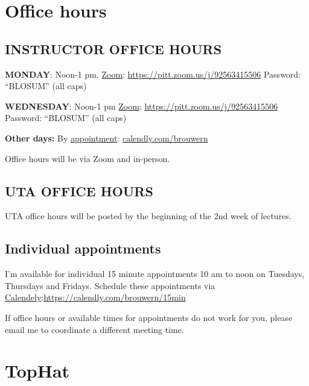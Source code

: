 \documentclass[
]{book}
\begin{document}
\hypertarget{office-hours}{%
\chapter{Office hours}\label{office-hours}}

\hypertarget{instructor-office-hours}{%
\section{INSTRUCTOR OFFICE HOURS}\label{instructor-office-hours}}

\textbf{MONDAY}: Noon-1 pm.
\href{https://pitt.zoom.us/j/92563415506}{Zoom}: \url{https://pitt.zoom.us/j/92563415506}
Password: ``BLOSUM'' (all caps)

\textbf{WEDNESDAY}: Noon-1 pm
\href{https://pitt.zoom.us/j/92563415506}{Zoom}: \url{https://pitt.zoom.us/j/92563415506}
Password: ``BLOSUM'' (all caps)

\textbf{Other days:} By \href{www.calendly.com/brouwern}{appointment}: \href{www.calendly.com/brouwern}{calendly.com/brouwern}

Office hours will be via Zoom and in-person.

\hypertarget{uta-office-hours}{%
\section{UTA OFFICE HOURS}\label{uta-office-hours}}

UTA office hours will be posted by the beginning of the 2nd week of lectures.

\hypertarget{individual-appointments}{%
\section{Individual appointments}\label{individual-appointments}}

I'm available for individual 15 minute appointments 10 am to noon on Tuesdays, Thursdays and Fridays. Schedule these appointments via \href{https://calendly.com/brouwern/15min}{Calendely}:\url{https://calendly.com/brouwern/15min}

If office hours or available times for appointments do not work for you, please email me to coordinate a different meeting time.

\hypertarget{tophat}{%
\chapter{TopHat}\label{tophat}}
\end{document}
